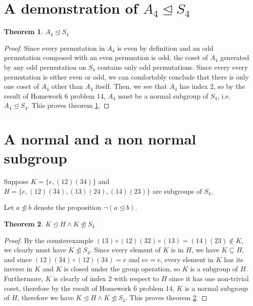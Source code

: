 \documentclass[12pt]{article}
\newtheorem{thm}{Theorem}
\begin{document}
\section{A demonstration of $A_4 \trianglelefteq S_4$}

\begin{thm} \label{thm10}
	$A_4 \trianglelefteq S_4$
\end{thm}

\begin{proof}
	Since every permutation in $A_4$ is even by definition
	and an odd permutation composed with an even permuation is odd,
	the coset of $A_4$ generated by any odd permutation on $S_4$
	contains only odd permutations.
	Since every every permutation is either even or odd,
	we can comfortably conclude that there is only one coset of $A_4$ other than $A_4$ itself.
	Then, we see that $A_4$ has index $2$,
	so by the result of Homework 6 problem 14,
	$A_4$ must be a normal subgroup of $S_4$, i.e. $A_4 \trianglelefteq S_4$.
	This proves theorem \ref{thm10}.
\end{proof}

\section{A normal and a non normal subgroup}

Suppose $K = \{ e, (12)(34) \}$ and $H = \{e, (12)(34), (13)(24), (14)(23) \}$
are subgroups of $S_4$.

Let $a \not\trianglelefteq b$ denote the proposition $\neg(a \trianglelefteq b)$.

\begin{thm} \label{thm11}
	$K \trianglelefteq H \land K \not\trianglelefteq S_4$
\end{thm}

\begin{proof}
	By the counterexample $(13) \circ (12)(32) \circ (13) = (14)(23) \not\in K$,
	we clearly must have $K \not\trianglelefteq S_4$.
	Since every element of $K$ is in $H$, we have $K \subseteq H$,
	and since $(12)(34) \circ (12)(34) = e$ and $ee = e$,
	every element in $K$ has its inverse in $K$ and $K$ is closed
	under the group operation, so $K$ is a subgroup of $H$.
	Furthermore, $K$ is clearly of index $2$ with respect to $H$
	since it has one non-trivial coset,
	therefore by the result of Homework 6 problem 14,
	$K$ is a normal subgroup of $H$,
	therefore we have
	$K \trianglelefteq H \land K \not\trianglelefteq S_4$.
	This proves theorem \ref{thm11}.
\end{proof}
\end{document}
